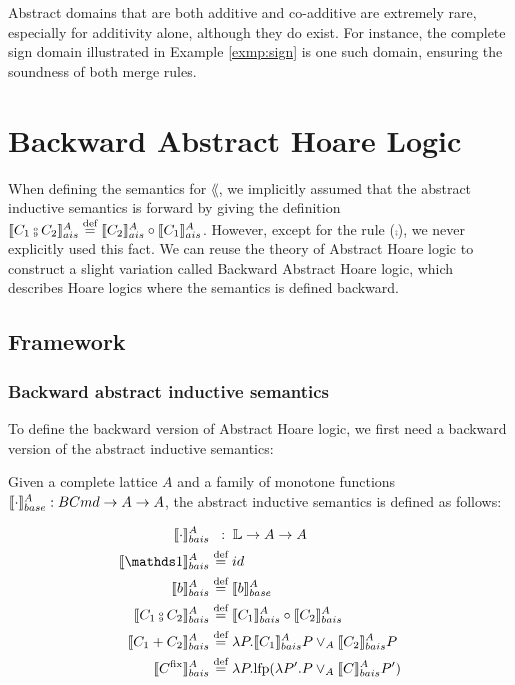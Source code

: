 \documentclass[
  10pt,       %
  twoside,    %
  a4paper,    %
  english,    %
  tikz,       %
  openright,  %
]{book}
\begin{document}
Abstract domains that are both additive and co-additive are extremely rare,
especially for additivity alone, although they do exist. For instance, the
complete sign domain illustrated in Example \ref{exmp:sign} is one such domain,
ensuring the soundness of both merge rules.
\chapter{Backward Abstract Hoare Logic}

When defining the semantics for $\lang$, we implicitly assumed that the
abstract inductive semantics is forward by giving the definition $\asem{C_1
\fcmp C_2} \defeq \asem{C_2} \circ \asem{C_1}$. However, except for the rule
($\fcmp$), we never explicitly used this fact. We can reuse the theory of
Abstract Hoare logic to construct a slight variation called Backward Abstract
Hoare logic, which describes Hoare logics where the semantics is defined
backward.

\section{Framework}

\subsection{Backward abstract inductive semantics}

To define the backward version of Abstract Hoare logic, we first need a
backward version of the abstract inductive semantics:

\begin{definition}
  Given a complete lattice $A$ and a family of monotone functions $\llbracket \cdot \rrbracket_{base}^A :
  BCmd \to A \to A$, the abstract inductive semantics is defined as
  follows:

  \begin{align*}
      \asemback{\cdot}         & \;\;:\; \lang \to A \to A \\
      \asemback{\sskip}        &\defeq id \\
      \asemback{b}             &\defeq \bsem{b}^A \\
      \asemback{C_1 \fcmp C_2} &\defeq \asemback{C_1} \circ \asemback{C_2} \\
      \asemback{C_1 + C_2}     &\defeq \lambda P . \asemback{C_1} P \join_A \asemback{C_2} P \\
      \asemback{C^\fix}        &\defeq \lambda P . \lfp(\lambda P'. P \join_A \asemback{C} P')
  \end{align*}
\end{definition}
\end{document}
